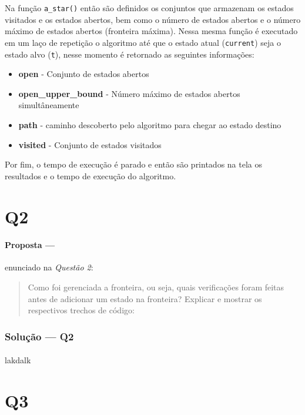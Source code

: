 \documentclass[12pt]{article}
\begin{document}
Na função \texttt{a\_star()} então são definidos os conjuntos que armazenam os estados visitados e os estados abertos, bem como o número de estados abertos e o número máximo de estados abertos (fronteira máxima). Nessa mesma função é executado em um laço de repetição o algoritmo até que o estado atual (\texttt{current}) seja o estado alvo (\texttt{t}), nesse momento é retornado as seguintes informações:

\begin{itemize}
  \item \textbf{open} - Conjunto de estados abertos
  \item \textbf{open\_upper\_bound} - Número máximo de estados abertos simultâneamente
  \item \textbf{path} - caminho descoberto pelo algoritmo para chegar ao estado destino
  \item \textbf{visited} - Conjunto de estados visitados
\end{itemize}

Por fim, o tempo de execução é parado e então são printados na tela os resultados e o tempo de execução do algoritmo.

\section{Q2}

\paragraph{Proposta ---} enunciado na \textit{Questão 2}:

\begin{quote}
Como foi gerenciada a fronteira, ou seja, quais verificações foram feitas antes de adicionar um estado na fronteira? Explicar e mostrar os respectivos trechos de código:
\end{quote}

\subsubsection{Solução --- \textbf{Q2}}

\paragraph{}
lakdalk

\section{Q3}
\end{document}
